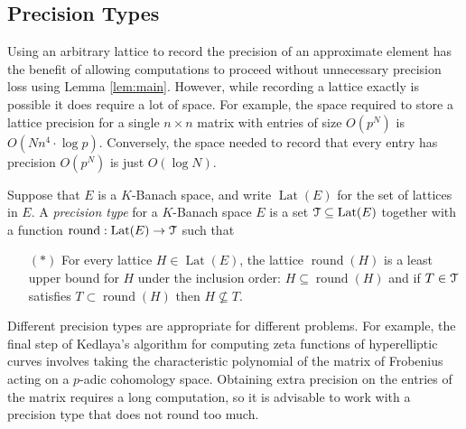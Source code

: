 \documentclass{lms}
\DeclareMathOperator{\Lat}{Lat}
\DeclareMathOperator{\round}{round}
\begin{document}
\subsection{Precision Types}

Using an arbitrary lattice to record the precision of an approximate 
element has the benefit of allowing computations to proceed without 
unnecessary precision loss using Lemma \ref{lem:main}.  However, while 
recording a lattice exactly is possible it does require a lot of space.  
For example, the space required to store a lattice precision for a 
single $n \times n$ matrix with entries of size $O(p^N)$ is $O(Nn^4 
\cdot \log p)$.  Conversely, the space needed to record that every entry 
has precision $O(p^N)$ is just $O(\log N)$.

\begin{deftn}
Suppose that $E$ is a $K$-Banach space, and write $\Lat(E)$ for the set of lattices in $E$.
A \emph{precision type} for a $K$-Banach space $E$ is a set $\T \subseteq \Lat(E)$ together
with a function $\round : \Lat(E) \to \T$ such that
\begin{itemize}
\item[$(\ast)$] For every lattice $H \in \Lat(E)$, the lattice $\round(H)$ is a least upper bound for $H$ under the inclusion order:
$H \subseteq \round(H)$ and if $T \in \T$ satisfies $T \subset \round(H)$ then $H \not\subseteq T$.
\end{itemize}
\end{deftn}

Different precision types are appropriate for different problems.  For example,
the final step of Kedlaya's algorithm for computing zeta functions of hyperelliptic
curves involves taking the characteristic polynomial of the matrix of Frobenius acting
on a $p$-adic cohomology space.  Obtaining extra precision on the entries of the
matrix requires a long computation, so it is advisable to work with a precision type
that does not round too much.
\end{document}
